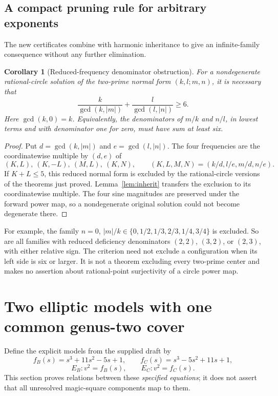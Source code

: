 \documentclass[11pt]{article}
\newtheorem{corollary}[theorem]{Corollary}
\theoremstyle{definition}\newtheorem{definition}[theorem]{Definition}
\theoremstyle{remark}\newtheorem{remark}[theorem]{Remark}
\begin{document}
\subsection{A compact pruning rule for arbitrary exponents}
The new certificates combine with harmonic inheritance to give an infinite-family consequence without any further elimination.
\begin{corollary}[Reduced-frequency denominator obstruction]\label{cor:reduced}
For a nondegenerate rational-circle solution of the two-prime normal form $(k,l;m,n)$, it is necessary that
\begin{equation}\label{eq:gcdcriterion}
\boxed{\frac{k}{\gcd(k,|m|)}+\frac{l}{\gcd(l,|n|)}\ge6.}
\end{equation}
Here $\gcd(k,0)=k$. Equivalently, the denominators of $m/k$ and $n/l$, in lowest terms and with denominator one for zero, must have sum at least six.
\end{corollary}
\begin{proof}
Put $d=\gcd(k,|m|)$ and $e=\gcd(l,|n|)$. The four frequencies are the coordinatewise multiple by $(d,e)$ of
\[
(K,L),\ (K,-L),\ (M,L),\ (K,N),\qquad
(K,L,M,N)=(k/d,l/e,m/d,n/e).
\]
If $K+L\le5$, this reduced normal form is excluded by the rational-circle versions of the theorems just proved. Lemma~\ref{lem:inherit} transfers the exclusion to its coordinatewise multiple. The four sine magnitudes are preserved under the forward power map, so a nondegenerate original solution could not become degenerate there.
\end{proof}
For example, the family $n=0$, $|m|/k\in\{0,1/2,1/3,2/3,1/4,3/4\}$ is excluded. So are all families with reduced deficiency denominators $(2,2)$, $(3,2)$, or $(2,3)$, with either relative sign. The criterion need not exclude a configuration when its left side is six or larger. It is not a theorem excluding every two-prime center and makes no assertion about rational-point surjectivity of a circle power map.

\section{Two elliptic models with one common genus-two cover}\label{sec:curves}
Define the explicit models from the supplied draft by
\[
f_B(s)=s^3+11s^2-5s+1,\qquad f_C(s)=s^3-5s^2+11s+1,
\]
\[
E_B:v^2=f_B(s),\qquad E_C:v^2=f_C(s).
\]
This section proves relations between these \emph{specified equations}; it does not assert that all unresolved magic-square components map to them.
\end{document}
